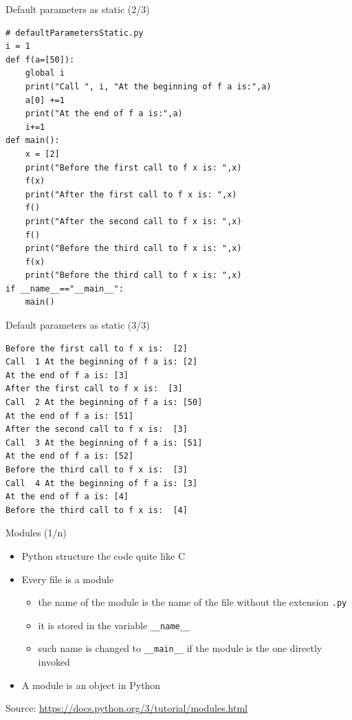 \documentclass{beamer}
\begin{document}
\begin{frame}[fragile]
{\centerline{Default parameters as static (2/3)}}
\begin{lstlisting}[style=myPythonStyle]
# defaultParametersStatic.py
i = 1
def f(a=[50]):
	global i
	print("Call ", i, "At the beginning of f a is:",a)
	a[0] +=1
	print("At the end of f a is:",a)
	i+=1
def main():
	x = [2]
	print("Before the first call to f x is: ",x)
	f(x)
	print("After the first call to f x is: ",x)
	f()
	print("After the second call to f x is: ",x)
	f()
	print("Before the third call to f x is: ",x)
	f(x)
	print("Before the third call to f x is: ",x)
if __name__=="__main__":
	main()
\end{lstlisting}

\end{frame}

\begin{frame}[fragile]
{\centerline{Default parameters as static (3/3)}}
\begin{lstlisting}[style=myPythonStyle]
% python3.11 defaultParametersStatic.py
Before the first call to f x is:  [2]
Call  1 At the beginning of f a is: [2]
At the end of f a is: [3]
After the first call to f x is:  [3]
Call  2 At the beginning of f a is: [50]
At the end of f a is: [51]
After the second call to f x is:  [3]
Call  3 At the beginning of f a is: [51]
At the end of f a is: [52]
Before the third call to f x is:  [3]
Call  4 At the beginning of f a is: [3]
At the end of f a is: [4]
Before the third call to f x is:  [4]
\end{lstlisting}

\end{frame}

\begin{frame}[fragile]
{\centerline{Modules (1/n)}}
\begin{itemize}
       \item Python structure the code quite like C
       \item Every file is a module
       \begin{itemize}
		\item the name of the module is the name of the file without the extension \texttt{.py}
		\item it is stored in the variable \texttt{\_\_name\_\_}
		\item such name is changed to \texttt{\_\_main\_\_} if the module is the one directly invoked
        \end{itemize}
        \item A module is an object in Python
    \end{itemize}
    \begin{center}
	\tiny Source: \url{https://docs.python.org/3/tutorial/modules.html}
    \end{center}
\end{frame}
\end{document}

